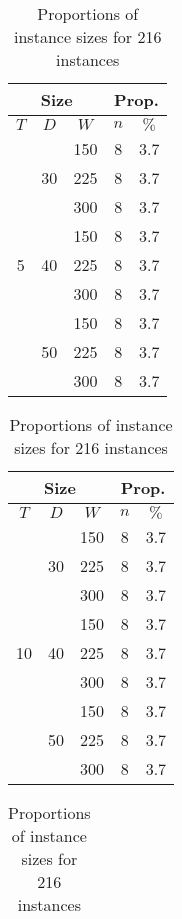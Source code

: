 \documentclass[../../thesis.tex]{subfiles}
\begin{document}
\begin{table}[H]
  \caption{Proportions of instance sizes for 216 instances}
  \label{instances:proportions}
  \centering
  \begin{tabular}[t]{|c|c|c |c|c|}
    \hline
    \multicolumn{3}{|c|}{Size} & \multicolumn{2}{|c|}{Prop.} \\
    \hline 
    $T$ & $D$ & $W$ & $n$ & $\%$ \\
    \hline 
    \multirow{9}{*}{5} & \multirow{3}{*}{30} & 150 & 8 & 3.7 \\ 
    \cline{3-5}
     &  & 225 & 8 & 3.7 \\ 
     \cline{3-5}
     &  & 300 & 8 & 3.7 \\ 
     \cline{2-5}
     & \multirow{3}{*}{40} & 150 & 8 & 3.7 \\ 
     \cline{3-5}
     &  & 225 & 8 & 3.7 \\ 
     \cline{3-5}
     &  & 300 & 8 & 3.7 \\ 
     \cline{2-5}
     & \multirow{3}{*}{50} & 150 & 8 & 3.7 \\ 
     \cline{3-5}
     &  & 225 & 8 & 3.7 \\ 
     \cline{3-5}
     &  & 300 & 8 & 3.7 \\ 
    \hline
  \end{tabular}
  \hfill
  \begin{tabular}[t]{|c|c|c |c|c|}
    \hline
    \multicolumn{3}{|c|}{Size} & \multicolumn{2}{|c|}{Prop.} \\
    \hline 
    $T$ & $D$ & $W$ & $n$ & $\%$ \\
    \hline 
    \multirow{9}{*}{10} & \multirow{3}{*}{30} & 150 & 8 & 3.7 \\ 
    \cline{3-5}
     &  & 225 & 8 & 3.7 \\ 
     \cline{3-5}
     &  & 300 & 8 & 3.7 \\ 
     \cline{2-5}
     & \multirow{3}{*}{40} & 150 & 8 & 3.7 \\ 
     \cline{3-5}
     &  & 225 & 8 & 3.7 \\ 
     \cline{3-5}
     &  & 300 & 8 & 3.7 \\ 
     \cline{2-5}
     & \multirow{3}{*}{50} & 150 & 8 & 3.7 \\ 
     \cline{3-5}
     &  & 225 & 8 & 3.7 \\ 
     \cline{3-5}
     &  & 300 & 8 & 3.7 \\ 
    \hline
  \end{tabular}
  \hfill
  \begin{tabular}[t]{|c|c|c |c|c|}

\end{tabular}
\end{table}
\end{document}
